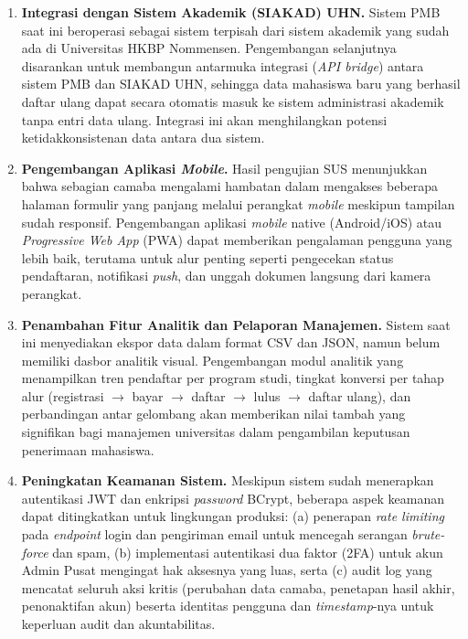 \begin{enumerate}
	\item \textbf{Integrasi dengan Sistem Akademik (SIAKAD) UHN.} Sistem PMB saat ini beroperasi sebagai sistem terpisah dari sistem akademik yang sudah ada di Universitas HKBP Nommensen. Pengembangan selanjutnya disarankan untuk membangun antarmuka integrasi (\textit{API bridge}) antara sistem PMB dan SIAKAD UHN, sehingga data mahasiswa baru yang berhasil daftar ulang dapat secara otomatis masuk ke sistem administrasi akademik tanpa entri data ulang. Integrasi ini akan menghilangkan potensi ketidakkonsistenan data antara dua sistem.
	
	\item \textbf{Pengembangan Aplikasi \textit{Mobile}.} Hasil pengujian SUS menunjukkan bahwa sebagian camaba mengalami hambatan dalam mengakses beberapa halaman formulir yang panjang melalui perangkat \textit{mobile} meskipun tampilan sudah responsif. Pengembangan aplikasi \textit{mobile} native (Android/iOS) atau \textit{Progressive Web App} (PWA) dapat memberikan pengalaman pengguna yang lebih baik, terutama untuk alur penting seperti pengecekan status pendaftaran, notifikasi \textit{push}, dan unggah dokumen langsung dari kamera perangkat.
	
	\item \textbf{Penambahan Fitur Analitik dan Pelaporan Manajemen.} Sistem saat ini menyediakan ekspor data dalam format CSV dan JSON, namun belum memiliki dasbor analitik visual. Pengembangan modul analitik yang menampilkan tren pendaftar per program studi, tingkat konversi per tahap alur (registrasi $\rightarrow$ bayar $\rightarrow$ daftar $\rightarrow$ lulus $\rightarrow$ daftar ulang), dan perbandingan antar gelombang akan memberikan nilai tambah yang signifikan bagi manajemen universitas dalam pengambilan keputusan penerimaan mahasiswa.
	
	\item \textbf{Peningkatan Keamanan Sistem.} Meskipun sistem sudah menerapkan autentikasi JWT dan enkripsi \textit{password} BCrypt, beberapa aspek keamanan dapat ditingkatkan untuk lingkungan produksi: (a) penerapan \textit{rate limiting} pada \textit{endpoint} login dan pengiriman email untuk mencegah serangan \textit{brute-force} dan spam, (b) implementasi autentikasi dua faktor (2FA) untuk akun Admin Pusat mengingat hak aksesnya yang luas, serta (c) audit log yang mencatat seluruh aksi kritis (perubahan data camaba, penetapan hasil akhir, penonaktifan akun) beserta identitas pengguna dan \textit{timestamp}-nya untuk keperluan audit dan akuntabilitas.
\end{enumerate}